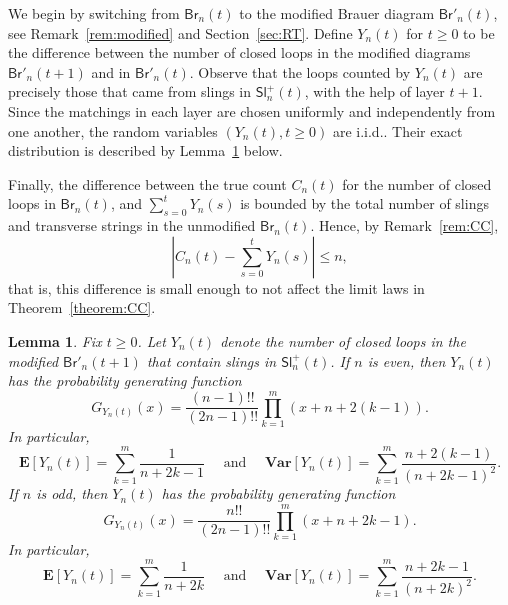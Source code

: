 \documentclass[a4paper,11pt,reqno]{amsart}
\newcommand{\paul}[1]{\todo[color=yellow!70,inline]{Paul: #1}}
\newcommand{\fabian}[1]{\todo[color=red!50,inline]{Fabian: #1}}
\newcommand{\bE}{\mathbf{E}}
\newcommand{\bVar}{\mathbf{Var}}
\newcommand{\Br}{\mathsf{Br}}
\newcommand{\Slr}{\mathsf{Sl}^+}
\newtheorem{lemma}{Lemma}
\theoremstyle{definition}
\begin{document}
We begin by switching from $\Br_n(t)$ to the modified Brauer diagram $\Br'_n(t)$, see Remark~\ref{rem:modified} and Section~\ref{sec:RT}. Define $Y_n(t)$ for $t\geq 0$ to be the difference between the number of closed loops in the modified diagrams $\Br'_n(t+1)$ and in $\Br'_n(t)$. Observe that the loops counted by $Y_n(t)$ are precisely those that came from slings in $\Slr_n(t)$, with the help of layer $t+1$. 
Since the matchings in each layer are chosen uniformly and independently from one another, the random variables $(Y_n(t), t\geq 0)$ are i.i.d.. Their exact distribution is described by Lemma~\ref{lemma:CCYdistr} below.  

Finally, the difference between the true count $C_n(t)$ for the number of closed loops in $\Br_n(t)$, and $\sum_{s=0}^t Y_n(s)$ is bounded by the total number of slings and transverse strings in the unmodified $\Br_n(t)$. Hence, by Remark~\ref{rem:CC},
\[
 \left|C_n(t)-\sum_{s=0}^t Y_n(s)\right|\leq n,
\]
that is, this difference is small enough to not affect the limit laws in Theorem~\ref{theorem:CC}.

\begin{lemma}\label{lemma:CCYdistr}
Fix $t\geq 0$. Let $Y_n(t)$ denote the number of closed loops in the modified $\Br'_n(t+1)$ that contain slings in $\Slr_n(t)$. If $n$ is even, then $Y_n(t)$ has the probability generating function 
 \begin{equation}\label{eq:pgfYeven}
  G_{Y_n(t)}(x)=\frac{(n-1)!!}{(2n-1)!!}\prod_{k=1}^m (x+n+2(k-1)). 
 \end{equation}
In particular,
 \begin{equation}\label{eq:evenYmoments}
  \bE[Y_n(t)] = \sum_{k=1}^m \frac{1}{n+2k-1} \quad \text{ and } \quad 
  \bVar[Y_n(t)]= \sum_{k=1}^m \frac{n+2(k-1)}{(n+2k-1)^2}.
 \end{equation}
 If $n$ is odd, then $Y_n(t)$ has the probability generating function 
 \begin{equation}\label{eq:pgfYodd}
  G_{Y_n(t)}(x)=\frac{n!!}{(2n-1)!!}\prod_{k=1}^m (x+n+2k-1). 
 \end{equation}
In particular,
 \begin{equation}\label{eq:oddYmoments}
  \bE[Y_n(t)] = \sum_{k=1}^m \frac{1}{n+2k} \quad \text{ and } \quad 
  \bVar[Y_n(t)]= \sum_{k=1}^m \frac{n+2k-1}{(n+2k)^2}.
 \end{equation}
\end{lemma}
\end{document}
